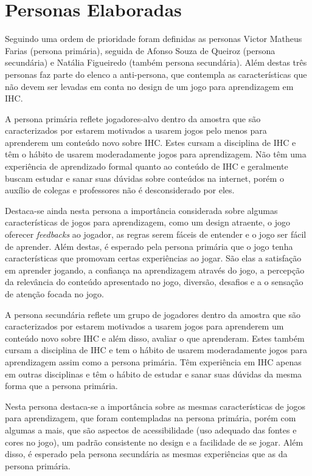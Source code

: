 \section{Personas Elaboradas}

Seguindo uma ordem de prioridade foram definidas as personas Victor Matheus Farias (persona primária), seguida de Afonso Souza de Queiroz (persona secundária) e Natália Figueiredo (também persona secundária). Além destas três personas faz parte do elenco a anti-persona, que contempla as características que não devem ser levadas em conta no design de um jogo para aprendizagem em IHC.

A persona primária reflete jogadores-alvo dentro da amostra que são caracterizados por estarem motivados a usarem jogos pelo menos para aprenderem um conteúdo novo sobre IHC. Estes cursam a disciplina de IHC e têm o hábito de usarem moderadamente jogos para aprendizagem. Não têm uma experiência de aprendizado formal quanto ao conteúdo de IHC e geralmente buscam estudar e sanar suas dúvidas sobre conteúdos na internet, porém o auxílio de colegas e professores não é desconsiderado por eles.

Destaca-se ainda nesta persona a importância considerada sobre algumas características de jogos para aprendizagem, como um design atraente, o jogo oferecer \textit{feedbacks} ao jogador, as regras serem fáceis de entender e o jogo ser fácil de aprender. Além destas, é esperado pela persona primária que o jogo tenha características que promovam certas experiências ao jogar. São elas a satisfação em aprender jogando, a confiança na aprendizagem através do jogo, a percepção da relevância do conteúdo apresentado no jogo, diversão, desafios e a o sensação de atenção focada no jogo.

A persona secundária reflete um grupo de jogadores dentro da amostra que são caracterizados por estarem motivados a usarem jogos para aprenderem um conteúdo novo sobre IHC e além disso, avaliar o que aprenderam. Estes também cursam a disciplina de IHC e tem o hábito de usarem moderadamente jogos para aprendizagem assim como a persona primária. Têm experiência em IHC apenas em outras disciplinas e têm o hábito de estudar e sanar suas dúvidas da mesma forma que a persona primária.

Nesta persona destaca-se a importância sobre as mesmas características de jogos para aprendizagem, que foram contempladas na persona primária, porém com algumas a mais, que são aspectos de acessibilidade (uso adequado das fontes e cores no jogo), um padrão consistente no design e a facilidade de se jogar. Além disso, é esperado pela persona secundária as mesmas experiências que as da persona primária.

